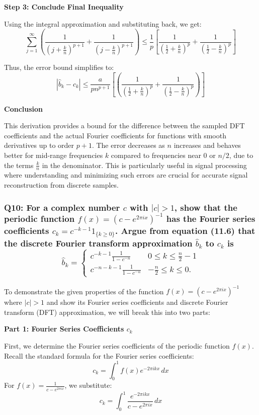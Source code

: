 \documentclass[8pt]{article}
\begin{document}
\textbf{Step 3: Conclude Final Inequality}

Using the integral approximation and substituting back, we get:
\[ \sum_{j=1}^\infty \left( \frac{1}{(j + \frac{k}{n})^{p+1}} + \frac{1}{(j - \frac{k}{n})^{p+1}} \right) \leq \frac{1}{p} \left[ \frac{1}{\left(\frac{1}{2} + \frac{k}{n}\right)^p} + \frac{1}{\left(\frac{1}{2} - \frac{k}{n}\right)^p} \right] \]

Thus, the error bound simplifies to:
\[
|\hat{b}_k - c_k| \leq \frac{a}{pn^{p+1}} \left[ \left( \frac{1}{\left( \frac{1}{2} + \frac{k}{n} \right)^p} + \frac{1}{\left( \frac{1}{2} - \frac{k}{n} \right)^p} \right) \right]
\]


\textbf{Conclusion}

This derivation provides a bound for the difference between the sampled DFT coefficients and the actual Fourier coefficients for functions with smooth derivatives up to order \(p+1\). The error decreases as \(n\) increases and behaves better for mid-range frequencies \(k\) compared to frequencies near \(0\) or \(n/2\), due to the terms \(\frac{k}{n}\) in the denominator. This is particularly useful in signal processing where understanding and minimizing such errors are crucial for accurate signal reconstruction from discrete samples.

\subsubsection*{Q10:
For a complex number \(c\) with \(|c| > 1\), show that the periodic function \(f(x) = (c - e^{2\pi ix})^{-1}\) has the Fourier series coefficients \(c_k = c^{-k-1}1_{\{k \geq 0\}}\). Argue from equation (11.6) that the discrete Fourier transform approximation \(\hat{b}_k\) to \(c_k\) is
\[
\hat{b}_k = \begin{cases}
c^{-k-1} \frac{1}{1 - c^{-n}} & 0 \leq k \leq \frac{n}{2} - 1 \\
c^{-n-k-1} \frac{1}{1 - c^{-n}} & -\frac{n}{2} \leq k \leq 0.
\end{cases}
\]}

To demonstrate the given properties of the function \(f(x) = (c - e^{2\pi ix})^{-1}\) where \(|c| > 1\) and show its Fourier series coefficients and discrete Fourier transform (DFT) approximation, we will break this into two parts:

\textbf{Part 1: Fourier Series Coefficients \(c_k\)}

First, we determine the Fourier series coefficients of the periodic function \(f(x)\). Recall the standard formula for the Fourier series coefficients:
\[
c_k = \int_0^1 f(x) e^{-2\pi i k x} \, dx
\]
For \(f(x) = \frac{1}{c - e^{2\pi ix}}\), we substitute:
\[
c_k = \int_0^1 \frac{e^{-2\pi i k x}}{c - e^{2\pi ix}} \, dx
\]
\end{document}
